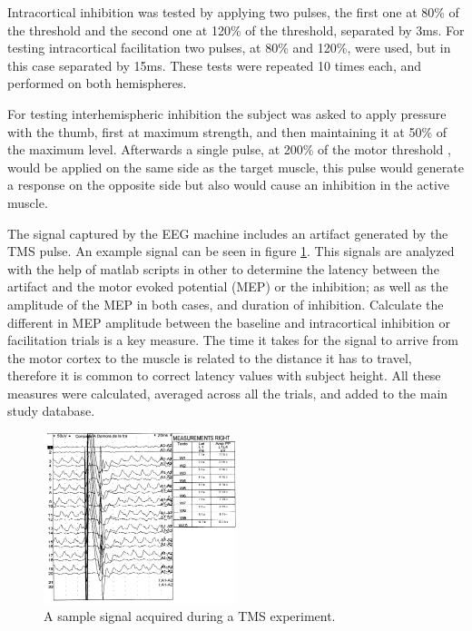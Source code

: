 
Intracortical inhibition was tested by applying two pulses, the first one at 80\% of the threshold and the second one at 120\% of the threshold, separated by 3ms. For testing intracortical facilitation two pulses, at 80\% and 120\%, were used, but in this case separated by 15ms. These tests were repeated 10 times each, and performed on both hemispheres.

For testing interhemispheric inhibition the subject was asked to apply pressure with the thumb, first at maximum strength, and then maintaining it at 50\% of the maximum level. Afterwards a single pulse, at 200\% of the motor threshold , would be applied on the same side as the target muscle, this pulse would generate a response on the opposite side but also would cause an inhibition in the active muscle. 

The signal captured by the EEG machine includes an artifact generated by the TMS pulse. An example signal can be seen in figure \ref{fig_tms_signal}. This signals are analyzed with the help of matlab scripts in other to determine the latency between the artifact and the motor evoked potential (MEP) or the inhibition; as well as the amplitude of the MEP in both cases, and duration of inhibition. Calculate the different in MEP amplitude between the baseline and intracortical inhibition or facilitation trials is a key measure. The time it takes for the signal to arrive from the motor cortex to the muscle is related to the distance it has to travel, therefore it is common to correct latency values with subject height. All these measures were calculated, averaged across all the trials, and added to the main study database.

\begin{figure}
	\centering
		\includegraphics[width=0.5\textwidth]{figures/kmc400/tms_signal}
	\caption{A sample signal acquired during a TMS experiment.}
	\label{fig_tms_signal}
\end{figure}
 

